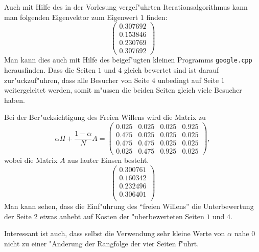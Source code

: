 \begin{loesung}
\begin{teilaufgaben}
Auch mit Hilfe des in der Vorlesung vergef"uhrten Iterationsalgorithmus
kann man folgenden Eigenvektor zum Eigenwert $1$ finden:
\[
\begin{pmatrix}
0.307692\\
0.153846\\
0.230769\\
0.307692
\end{pmatrix}
\]
Man kann dies auch mit Hilfe des beigef"ugten kleinen Programms
{\tt google.cpp} herausfinden.
Dass die Seiten $1$ und $4$ gleich bewertet sind ist darauf zur"uckzuf"uhren,
dass alle Besucher von Seite $4$ unbedingt auf Seite $1$ weitergeleitet
werden, somit m"ussen die beiden Seiten gleich viele Besucher haben.
\item
Bei der Ber"ucksichtigung des Freien Willens wird die Matrix zu
\[
\alpha H+\frac{1-\alpha}N A
=
\left(\begin{matrix}
0.025&0.025&0.025&0.925\\
0.475&0.025&0.025&0.025\\
0.475&0.475&0.025&0.025\\
0.025&0.475&0.925&0.025
\end{matrix}\right),
\]
wobei die Matrix $A$ aus lauter Einsen besteht.
\[
\left(\begin{matrix}
0.300761\\
0.160342\\
0.232496\\
0.306401\\
\end{matrix}\right)
\]
Man kann sehen, dass die Einf"uhrung des ``freien Willens'' die
Unterbewertung der Seite $2$ etwas anhebt auf Kosten der
"uberbewerteten Seiten $1$ und $4$.

Interessant ist auch, dass selbst die Verwendung sehr kleine Werte von
$\alpha$ nahe $0$ nicht zu einer "Anderung der Rangfolge der vier
Seiten f"uhrt.
\end{teilaufgaben}
\end{loesung}

